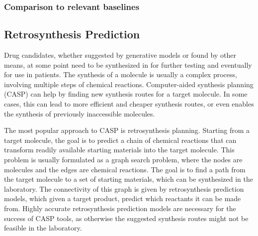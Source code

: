 \subsubsection{Comparison to relevant baselines}



\subsection{Retrosynthesis Prediction\label{sec:retrosynthesis}}
Drug candidates, whether suggested by generative models or found by other means,
at some point need to be synthesized in for further testing and 
eventually for use in patients. The synthesis of a molecule is usually a complex
process, involving multiple steps of chemical reactions. Computer-aided synthesis 
planning (CASP) can help by finding new synthesis routes for a target molecule.
In some cases, this can lead to more efficient and cheaper synthesis routes, or
even enables the synthesis of previously inaccessible molecules.

The most popular approach to CASP is retrosynthesis planning. Starting from a
target molecule, the goal is to predict a chain of chemical reactions that can
transform readily available starting materials into the target molecule. This
problem is usually formulated as a graph search problem, where the nodes are
molecules and the edges are chemical reactions. The goal is to find a path from
the target molecule to a set of starting materials, which can be synthesized in
the laboratory. The connectivity of this graph is given by retrosynthesis
prediction models, which given a target product, predict which reactants it can
be made from. Highly accurate retrosynthesis prediction models are necessary for
the success of CASP tools, as otherwise the suggested synthesis routes might not
be feasible in the laboratory.

